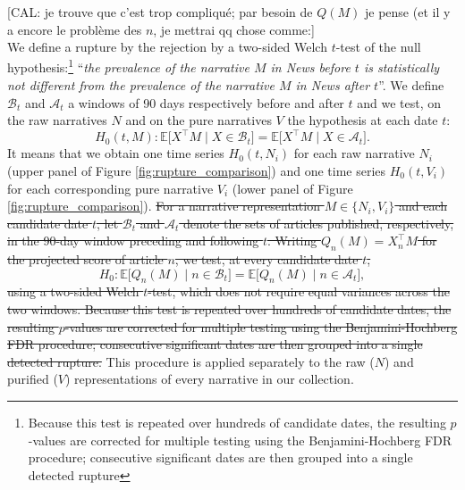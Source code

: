 \documentclass[
  journal=medium,
  manuscript=article-type,
  year=2025,
  volume=1,
]{cup-journal}
\begin{document}
{\color{red}
[CAL: je trouve que c'est trop compliqué; par besoin de $Q(M)$ je pense  (et il y a encore le problème des $n$, je mettrai qq chose comme:]}\\
{\color{Orange}
We define a rupture by the rejection by a two-sided Welch $t$-test of the null hypothesis:\footnote{Because this test is repeated over hundreds of candidate dates, the resulting $p$-values are corrected for multiple testing using the Benjamini-Hochberg FDR procedure; consecutive significant dates are then grouped into a single detected rupture} ``\emph{the prevalence of the narrative $M$ in News before $t$ is statistically not different from the prevalence of the narrative $M$ in News after $t$}''.
We define $\mathcal{B}_t$ and $\mathcal{A}_t$ a windows of 90 days respectively before and after $t$ and we test, on the raw narratives $N$ and on the pure narratives $V$ the hypothesis at each date $t$:
\[
H_0(t, M) : \mathbb{E}\bigl[X^\top M \mid X \in \mathcal{B}_t\bigr] = \mathbb{E}\bigl[X^\top M \mid X \in \mathcal{A}_t\bigr].
\]
It means that we obtain one time series $H_0(t, N_i)$ for each raw narrative $N_i$ (upper panel of Figure \ref{fig:rupture_comparison}) and one time series $H_0(t, V_i)$ for each corresponding pure narrative $V_i$ (lower panel of Figure \ref{fig:rupture_comparison}).
}
\st{For a narrative representation $M \in \{N_i, V_i\}$ and each candidate date $t$, let $\mathcal{B}_t$ and $\mathcal{A}_t$ denote the sets of articles published, respectively, in the 90-day window preceding and following $t$. Writing $Q_n(M) = X_n^\top M$ for the projected score of article $n$, we test, at every candidate date $t$,}
\[
H_0 : \mathbb{E}\bigl[Q_n(M) \mid n \in \mathcal{B}_t\bigr] = \mathbb{E}\bigl[Q_n(M) \mid n \in \mathcal{A}_t\bigr],
\]
\st{using a two-sided Welch $t$-test, which does not require equal variances across the two windows. Because this test is repeated over hundreds of candidate dates, the resulting $p$-values are corrected for multiple testing using the Benjamini-Hochberg FDR procedure; consecutive significant dates are then grouped into a single detected rupture.} This procedure is applied separately to the raw ($N$) and purified ($V$) representations of every narrative in our collection.
\end{document}
